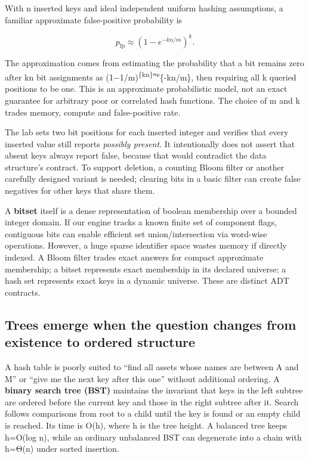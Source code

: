With n inserted keys and ideal independent uniform hashing assumptions, a familiar approximate false-positive probability is

\[
p_{\mathrm{fp}}\approx\left(1-e^{-kn/m}\right)^k.
\]

The approximation comes from estimating the probability that a bit remains zero after kn bit assignments as (1−1/m)\textsuperscript{\{kn\}≈e}\{-kn/m\}, then requiring all k queried positions to be one. This is an approximate probabilistic model, not an exact guarantee for arbitrary poor or correlated hash functions. The choice of m and k trades memory, compute and false-positive rate.

The lab sets two bit positions for each inserted integer and verifies that every inserted value still reports \emph{possibly present}. It intentionally does not assert that absent keys always report false, because that would contradict the data structure's contract. To support deletion, a counting Bloom filter or another carefully designed variant is needed; clearing bits in a basic filter can create false negatives for other keys that share them.

A \textbf{bitset} itself is a dense representation of boolean membership over a bounded integer domain. If our engine tracks a known finite set of component flags, contiguous bits can enable efficient set union/intersection via word-wise operations. However, a huge sparse identifier space wastes memory if directly indexed. A Bloom filter trades exact answers for compact approximate membership; a bitset represents exact membership in its declared universe; a hash set represents exact keys in a dynamic universe. These are distinct ADT contracts.

\subsection{Trees emerge when the question changes from existence to ordered structure}\label{01-foundations-i-ch007-trees-emerge-when-the-question-changes-from-existence-to-ordered-structure}

A hash table is poorly suited to ``find all assets whose names are between A and M'' or ``give me the next key after this one'' without additional ordering. A \textbf{binary search tree (BST)} maintains the invariant that keys in the left subtree are ordered before the current key and those in the right subtree after it. Search follows comparisons from root to a child until the key is found or an empty child is reached. Its time is O(h), where h is the tree height. A balanced tree keeps h=O(log n), while an ordinary unbalanced BST can degenerate into a chain with h=Θ(n) under sorted insertion.

